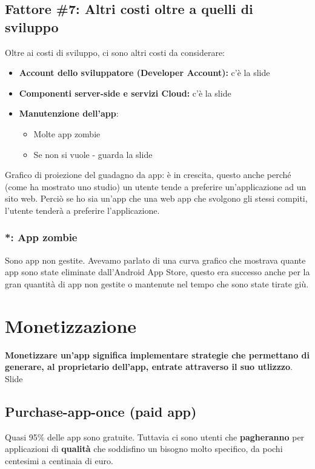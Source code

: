 \subsection{Fattore \#7: Altri costi oltre a quelli di sviluppo}
\par Oltre ai costi di sviluppo, ci sono altri costi da considerare:
\begin{itemize}
    \item \textbf{Account dello sviluppatore (Developer Account):} c'è la slide
    \item \textbf{Componenti server-side e servizi Cloud:} c'è la slide
    \item \textbf{Manutenzione dell'app}:
    \begin{itemize}
        \item Molte app zombie
        \item Se non si vuole - guarda la slide
    \end{itemize}
\end{itemize}
\par Grafico di proiezione del guadagno da app: è in crescita, questo anche perché (come ha mostrato uno studio) un utente tende a preferire un'applicazione ad un sito web. Perciò se ho sia un'app che una web app che svolgono gli stessi compiti, l'utente tenderà a preferire l'applicazione.

\subsubsection{*: App zombie}
\par Sono app non gestite. Avevamo parlato di una curva grafico che mostrava quante app sono state eliminate dall'Android App Store, questo era successo anche per la gran quantità di app non gestite o mantenute nel tempo che sono state tirate giù.

\section{Monetizzazione}
\par \textbf{Monetizzare un'app significa implementare strategie che permettano di generare, al proprietario dell'app, entrate attraverso il suo utlizzzo}. Slide

\subsection{Purchase-app-once (paid app)}
\par Quasi 95\% delle app sono gratuite. Tuttavia ci sono utenti che \textbf{pagheranno} per applicazioni di \textbf{qualità} che soddisfino un bisogno molto specifico, da pochi centesimi a centinaia di euro.

